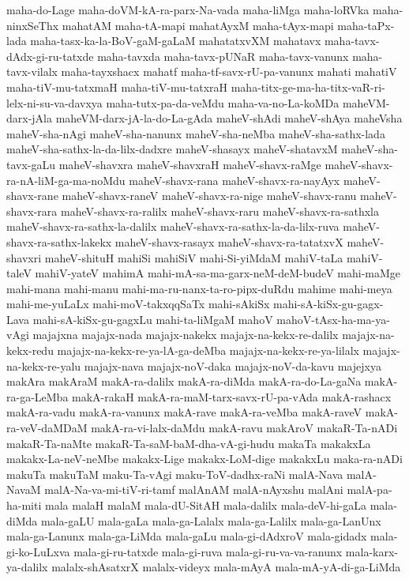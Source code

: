 {maha-do-Lage
maha-doVM-kA-ra-parx-Na-vada
maha-liMga
maha-loRVka
maha-ninxSeThx
mahatAM
maha-tA-mapi
mahatAyxM
maha-tAyx-mapi
maha-taPx-lada
maha-tasx-ka-la-BoV-gaM-gaLaM
mahatatxvXM
mahatavx
maha-tavx-dAdx-gi-ru-tatxde
maha-tavxda
maha-tavx-pUNaR
maha-tavx-vanunx
maha-tavx-vilalx
maha-tayxshacx
mahatf
maha-tf-savx-rU-pa-vanunx
mahati
mahatiV
maha-tiV-mu-tatxmaH
maha-tiV-mu-tatxraH
maha-titx-ge-ma-ha-titx-vaR-ri-lelx-ni-su-va-davxya
maha-tutx-pa-da-veMdu
maha-va-no-La-koMDa
maheVM-darx-jAla
maheVM-darx-jA-la-do-La-gAda
maheV-shAdi
maheV-shAya
maheVsha
maheV-sha-nAgi
maheV-sha-nanunx
maheV-sha-neMba
maheV-sha-sathx-lada
maheV-sha-sathx-la-da-lilx-dadxre
maheV-shasayx
maheV-shatavxM
maheV-sha-tavx-gaLu
maheV-shavxra
maheV-shavxraH
maheV-shavx-raMge
maheV-shavx-ra-nA-liM-ga-ma-noMdu
maheV-shavx-rana
maheV-shavx-ra-nayAyx
maheV-shavx-rane
maheV-shavx-raneV
maheV-shavx-ra-nige
maheV-shavx-ranu
maheV-shavx-rara
maheV-shavx-ra-ralilx
maheV-shavx-raru
maheV-shavx-ra-sathxla
maheV-shavx-ra-sathx-la-dalilx
maheV-shavx-ra-sathx-la-da-lilx-ruva
maheV-shavx-ra-sathx-lakekx
maheV-shavx-rasayx
maheV-shavx-ra-tatatxvX
maheV-shavxri
maheV-shituH
mahiSi
mahiSiV
mahi-Si-yiMdaM
mahiV-taLa
mahiV-taleV
mahiV-yateV
mahimA
mahi-mA-sa-ma-garx-neM-deM-budeV
mahi-maMge
mahi-mana
mahi-manu
mahi-ma-ru-nanx-ta-ro-pipx-duRdu
mahime
mahi-meya
mahi-me-yuLaLx
mahi-moV-takxqqSaTx
mahi-sAkiSx
mahi-sA-kiSx-gu-gagx-Lava
mahi-sA-kiSx-gu-gagxLu
mahi-ta-liMgaM
mahoV
mahoV-tAsx-ha-ma-ya-vAgi
majajxna
majajx-nada
majajx-nakekx
majajx-na-kekx-re-dalilx
majajx-na-kekx-redu
majajx-na-kekx-re-ya-lA-ga-deMba
majajx-na-kekx-re-ya-lilalx
majajx-na-kekx-re-yalu
majajx-nava
majajx-noV-daka
majajx-noV-da-kavu
majejxya
makAra
makAraM
makA-ra-dalilx
makA-ra-diMda
makA-ra-do-La-gaNa
makA-ra-ga-LeMba
makA-rakaH
makA-ra-maM-tarx-savx-rU-pa-vAda
makA-rashacx
makA-ra-vadu
makA-ra-vanunx
makA-rave
makA-ra-veMba
makA-raveV
makA-ra-veV-daMDaM
makA-ra-vi-lalx-daMdu
makA-ravu
makAroV
makaR-Ta-nADi
makaR-Ta-naMte
makaR-Ta-saM-baM-dha-vA-gi-hudu
makaTa
makakxLa
makakx-La-neV-neMbe
makakx-Lige
makakx-LoM-dige
makakxLu
maka-ra-nADi
makuTa
makuTaM
maku-Ta-vAgi
maku-ToV-dadhx-raNi
malA-Nava
malA-NavaM
malA-Na-va-mi-tiV-ri-tamf
malAnAM
malA-nAyxshu
malAni
malA-pa-ha-miti
mala
malaH
malaM
mala-dU-SitAH
mala-dalilx
mala-deV-hi-gaLa
mala-diMda
mala-gaLU
mala-gaLa
mala-ga-Lalalx
mala-ga-Lalilx
mala-ga-LanUnx
mala-ga-Lanunx
mala-ga-LiMda
mala-gaLu
mala-gi-dAdxroV
mala-gidadx
mala-gi-ko-LuLxva
mala-gi-ru-tatxde
mala-gi-ruva
mala-gi-ru-va-va-ranunx
mala-karx-ya-dalilx
malalx-shAsatxrX
malalx-videyx
mala-mAyA
mala-mA-yA-di-ga-LiMda
}
